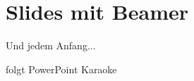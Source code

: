 \documentclass{beamer}
\begin{document}
\section{Slides mit Beamer}
\begin{frame}
Und jedem Anfang...
\end{frame}
\begin{frame}
folgt PowerPoint Karaoke
\end{frame}
\end{document}
